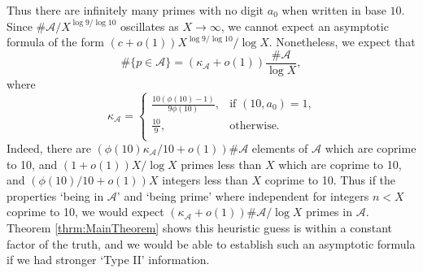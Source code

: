 \documentclass[10pt]{amsart}
\theoremstyle{plain}
\numberwithin{sblmm}{thrm}
\numberwithin{equation}{section}
\begin{document}
Thus there are infinitely many primes with no digit $a_0$ when written in base $10$. Since $\#\mathcal{A}/X^{\log{9}/\log{10}}$ oscillates as $X\rightarrow\infty$, we cannot expect an asymptotic formula of the form $(c+o(1))X^{\log{9}/\log{10}}/\log{X}$. Nonetheless, we expect that
\[
\#\{p\in\mathcal{A}\}= (\kappa_\mathcal{A}+o(1))\frac{\#\mathcal{A}}{\log{X}},
\]
where
\begin{equation}
\kappa_\mathcal{A}=
\begin{cases}
%
\frac{10(\phi(10)-1)}{9\phi(10)},&\text{if $(10,a_0)=1$,}\\
\frac{10}{9},&\text{otherwise.}\\
\end{cases}
\label{eq:KappaDef}
\end{equation}
Indeed, there are $(\phi(10)\kappa_\mathcal{A}/10+o(1))\#\mathcal{A}$ elements of $\mathcal{A}$ which are coprime to 10, and $(1+o(1))X/\log{X}$ primes less than $X$ which are coprime to 10, and $(\phi(10)/10+o(1))X$ integers less than $X$ coprime to 10. Thus if the properties `being in $\mathcal{A}$' and `being prime' where independent for integers $n< X$ coprime to 10, we would expect $(\kappa_\mathcal{A}+o(1)) \#\mathcal{A}/\log{X}$ primes in $\mathcal{A}$. Theorem \ref{thrm:MainTheorem} shows this heuristic guess is within a constant factor of the truth, and we would be able to establish such an asymptotic formula if we had stronger `Type II' information. %
\end{document}
